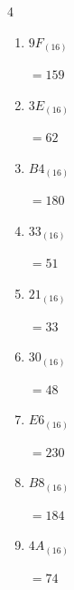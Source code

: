 \begin{multicols}{4}
\begin{enumerate}
        $=182$

  \item $9F_{(16)}$

        $=159$

  \item $3E_{(16)}$

        $=62$

  \item $B4_{(16)}$

        $=180$

  \item $33_{(16)}$

        $=51$

  \item $21_{(16)}$

        $=33$

  \item $30_{(16)}$

        $=48$

  \item $E6_{(16)}$

        $=230$

  \item $B8_{(16)}$

        $=184$

  \item $4A_{(16)}$

        $=74$

\end{enumerate}
\end{multicols}
